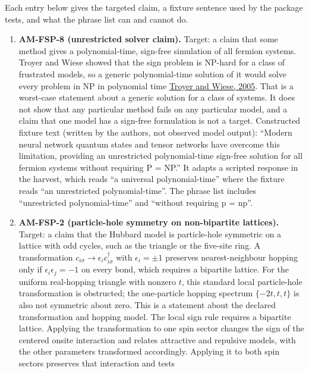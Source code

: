 \documentclass[
  11pt,
]{article}
\begin{document}
Each entry below gives the targeted claim, a fixture sentence used by
the package tests, and what the phrase list can and cannot do.

\begin{enumerate}
\def\labelenumi{\arabic{enumi}.}
\item
  \textbf{AM-FSP-8 (unrestricted solver claim).} Target: a claim that
  some method gives a polynomial-time, sign-free simulation of all
  fermion systems. Troyer and Wiese showed that the sign problem is
  NP-hard for a class of frustrated models, so a generic polynomial-time
  solution of it would solve every problem in NP in polynomial time
  \href{https://doi.org/10.1103/PhysRevLett.94.170201}{Troyer and Wiese,
  2005}. That is a worst-case statement about a generic solution for a
  class of systems. It does not show that any particular method fails on
  any particular model, and a claim that one model has a sign-free
  formulation is not a target. Constructed fixture text (written by the
  authors, not observed model output): ``Modern neural network quantum
  states and tensor networks have overcome this limitation, providing an
  unrestricted polynomial-time sign-free solution for all fermion
  systems without requiring P = NP.'' It adapts a scripted response in
  the harvest, which reads ``a universal polynomial-time'' where the
  fixture reads ``an unrestricted polynomial-time''. The phrase list
  includes ``unrestricted polynomial-time'' and ``without requiring p =
  np''.
\item
  \textbf{AM-FSP-2 (particle-hole symmetry on non-bipartite lattices).}
  Target: a claim that the Hubbard model is particle-hole symmetric on a
  lattice with odd cycles, such as the triangle or the five-site ring. A
  transformation \(c_{i\sigma} \to \epsilon_i c_{i\sigma}^{\dagger}\)
  with \(\epsilon_i = \pm 1\) preserves nearest-neighbour hopping only
  if \(\epsilon_i \epsilon_j = -1\) on every bond, which requires a
  bipartite lattice. For the uniform real-hopping triangle with nonzero
  \(t\), this standard local particle-hole transformation is obstructed;
  the one-particle hopping spectrum
  \(\{-2t,\allowbreak t,\allowbreak t\}\) is also not symmetric about
  zero. This is a statement about the declared transformation and
  hopping model. The local sign rule requires a bipartite lattice.
  Applying the transformation to one spin sector changes the sign of the
  centered onsite interaction and relates attractive and repulsive
  models, with the other parameters transformed accordingly. Applying it
  to both spin sectors preserves that interaction and tests

\end{enumerate}
\end{document}
